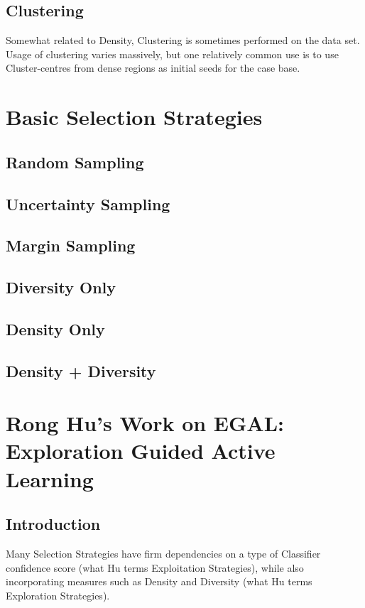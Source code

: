 \documentclass[a4paper,11pt]{report}
\begin{document}

\subsection{Clustering}
Somewhat related to Density, Clustering is sometimes performed on the data set. Usage of clustering varies massively, but one relatively common use is to use Cluster-centres from dense regions as initial seeds for the case base.


\section{Basic Selection Strategies}
\subsection{Random Sampling}
\subsection{Uncertainty Sampling}
\subsection{Margin Sampling}
\subsection{Diversity Only}
\subsection{Density Only}
\subsection{Density + Diversity}

\section{Rong Hu's Work on EGAL: Exploration Guided Active Learning}
\subsection{Introduction}
Many Selection Strategies have firm dependencies on a type of Classifier confidence score (what Hu terms Exploitation Strategies), while also incorporating measures such as Density and Diversity (what Hu terms Exploration Strategies).
\end{document}
